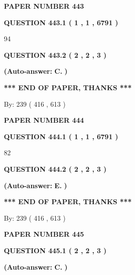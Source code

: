 \documentclass[12pt]{article}
\begin{document}
   
\newpage 
\setcounter{page}{ 
   443001 } 
   
   
 {\textbf{ \Large{ PAPER NUMBER  443  }}}
   
   
   
   
  
  
{\textbf{\large{QUESTION
443.1 
 ( 1 , 1 , 6791 )
}}}

94
  
  
{\textbf{\large{QUESTION
443.2 
 ( 2 , 2 , 3 )
}}}
 
 
{\textbf{(Auto-answer:}}
{\textbf{\large{
C.}}}
{\textbf{)}}
 
 
   
   
   
   
\vspace{1.0in} 
{\textbf{\large{ *** END OF PAPER, THANKS *** }}} 
   
   
\hspace{1.0in} By: 
 239 ( 416 ,  613 )
   
   
   
   
\newpage 
\setcounter{page}{ 
   444001 } 
   
   
 {\textbf{ \Large{ PAPER NUMBER  444  }}}
   
   
   
   
  
  
{\textbf{\large{QUESTION
444.1 
 ( 1 , 1 , 6791 )
}}}

82
  
  
{\textbf{\large{QUESTION
444.2 
 ( 2 , 2 , 3 )
}}}
 
 
{\textbf{(Auto-answer:}}
{\textbf{\large{
E.}}}
{\textbf{)}}
 
 
   
   
   
   
\vspace{1.0in} 
{\textbf{\large{ *** END OF PAPER, THANKS *** }}} 
   
   
\hspace{1.0in} By: 
 239 ( 416 ,  613 )
   
   
   
   
\newpage 
\setcounter{page}{ 
   445001 } 
   
   
 {\textbf{ \Large{ PAPER NUMBER  445  }}}
   
   
   
   
  
  
{\textbf{\large{QUESTION
445.1 
 ( 2 , 2 , 3 )
}}}
 
 
{\textbf{(Auto-answer:}}
{\textbf{\large{
C.}}}
{\textbf{)}}
 
 
  
\end{document}
